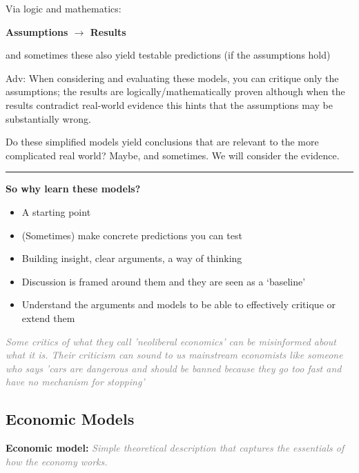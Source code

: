 \documentclass[]{article}
\begin{document}
Via logic and mathematics:

\textbf{Assumptions \(\rightarrow\) Results}\\

\bigskip

and sometimes these also yield testable predictions (if the assumptions hold)

\bigskip

\textcolor{RawSienna}{Adv: When considering and evaluating these models, you can critique only the assumptions;
the results are logically/mathematically proven although when the results contradict real-world evidence this hints that the assumptions may be substantially wrong.}

Do these simplified models yield conclusions that are relevant to the more complicated real world?
Maybe, and sometimes. We will consider the evidence.

\begin{center}\rule{0.5\linewidth}{\linethickness}\end{center}

\textbf{So why learn these models?}

\begin{itemize}
\item
  A starting point
\item
  (Sometimes) make concrete predictions you can test
\item
  Building insight, clear arguments, a way of thinking
\item
  Discussion is framed around them and they are seen as a `baseline'
\item
  Understand the arguments and models to be able to effectively critique or extend them
\end{itemize}

\emph{\textcolor{gray}{Some critics of what they call 'neoliberal economics' can be misinformed about what it is. Their criticism can sound to us mainstream economists like someone who says 'cars are dangerous and should be banned because they go too fast and have no mechanism for stopping'}}

\hypertarget{economic-models}{%
\subsection{Economic Models}\label{economic-models}}

\textbf{Economic model:}
\emph{\textcolor{gray}{Simple theoretical description that captures the essentials of how the economy works.}}
\end{document}
